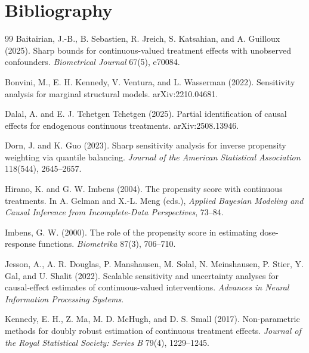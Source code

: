 \documentclass[11pt]{article}
\theoremstyle{definition}
\theoremstyle{plain}
\theoremstyle{remark}
\begin{document}
\section*{Bibliography}
\begin{thebibliography}{99}
Baitairian, J.-B., B. Sebastien, R. Jreich, S. Katsahian, and A. Guilloux (2025).
\newblock Sharp bounds for continuous-valued treatment effects with unobserved confounders.
\newblock \emph{Biometrical Journal} 67(5), e70084.

Bonvini, M., E. H. Kennedy, V. Ventura, and L. Wasserman (2022).
\newblock Sensitivity analysis for marginal structural models.
\newblock arXiv:2210.04681.

Dalal, A. and E. J. Tchetgen Tchetgen (2025).
\newblock Partial identification of causal effects for endogenous continuous treatments.
\newblock arXiv:2508.13946.

Dorn, J. and K. Guo (2023).
\newblock Sharp sensitivity analysis for inverse propensity weighting via quantile balancing.
\newblock \emph{Journal of the American Statistical Association} 118(544), 2645--2657.

Hirano, K. and G. W. Imbens (2004).
\newblock The propensity score with continuous treatments.
\newblock In A. Gelman and X.-L. Meng (eds.), \emph{Applied Bayesian Modeling and Causal Inference from Incomplete-Data Perspectives}, 73--84.

Imbens, G. W. (2000).
\newblock The role of the propensity score in estimating dose-response functions.
\newblock \emph{Biometrika} 87(3), 706--710.

Jesson, A., A. R. Douglas, P. Manshausen, M. Solal, N. Meinshausen, P. Stier, Y. Gal, and U. Shalit (2022).
\newblock Scalable sensitivity and uncertainty analyses for causal-effect estimates of continuous-valued interventions.
\newblock \emph{Advances in Neural Information Processing Systems}.

Kennedy, E. H., Z. Ma, M. D. McHugh, and D. S. Small (2017).
\newblock Non-parametric methods for doubly robust estimation of continuous treatment effects.
\newblock \emph{Journal of the Royal Statistical Society: Series B} 79(4), 1229--1245.


\end{thebibliography}
\end{document}
